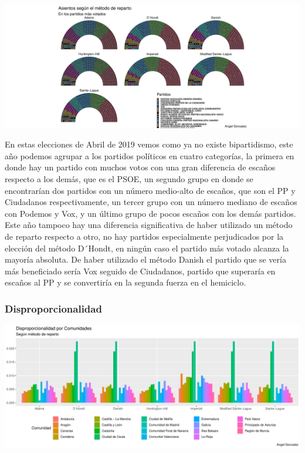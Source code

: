 \documentclass[12pt,a4paper,]{book}
\numberwithin{dummy}{section}
\theoremstyle{ocrenumbox}
\theoremstyle{blacknumex}
\theoremstyle{blacknumbox}
\theoremstyle{ocrenum}
\theoremstyle{ocrenum}
\begin{document}
\begin{center}\includegraphics[width=0.95\linewidth]{figurasR/unnamed-chunk-176-3} \end{center}

En estas elecciones de Abril de 2019 vemos como ya no existe
bipartidismo, este año podemos agrupar a los partidos políticos en
cuatro categorías, la primera en donde hay un partido con muchos votos
con una gran diferencia de escaños respecto a los demás, que es el PSOE,
un segundo grupo en donde se encontrarían dos partidos con un número
medio-alto de escaños, que son el PP y Ciudadanos respectivamente, un
tercer grupo con un número mediano de escaños con Podemos y Vox, y un
último grupo de pocos escaños con los demás partidos. Este año tampoco
hay una diferencia significativa de haber utilizado un método de reparto
respecto a otro, no hay partidos especialmente perjudicados por la
elección del método D´Hondt, en ningún caso el partido más votado
alcanza la mayoría absoluta. De haber utilizado el método Danish el
partido que se vería más beneficiado sería Vox seguido de Ciudadanos,
partido que superaría en escaños al PP y se convertiría en la segunda
fuerza en el hemiciclo.

\hypertarget{disproporcionalidad-13}{%
\subsubsection{Disproporcionalidad}\label{disproporcionalidad-13}}

\begin{center}\includegraphics[width=0.95\linewidth]{figurasR/unnamed-chunk-177-1} \end{center}
\end{document}
